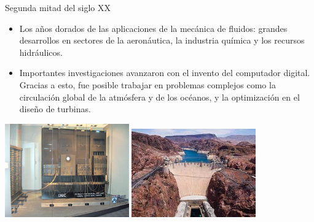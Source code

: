\documentclass [xcolor=svgnames, t] {beamer}
\begin{document}
\begin{frame}{Segunda mitad del siglo XX}
\vspace{-0.4cm}
\begin{exampleblock}{}
\begin{itemize}
\item Los a\~nos dorados de las aplicaciones de la mecánica de fluidos: grandes desarrollos en sectores de la aeronáutica, la industria química y los recursos hidráulicos.
\item Importantes investigaciones avanzaron con el invento del computador digital. Gracias a esto, fue posible trabajar en problemas complejos como la circulación global de la atmósfera y de los océanos, y la optimización en el diseño de turbinas.
\end{itemize}
\end{exampleblock}
\begin{center}
\includegraphics[width=0.4\textwidth]{compu}
\includegraphics[width=0.4\textwidth]{hoov}
\end{center}
\end{frame}
\end{document}
